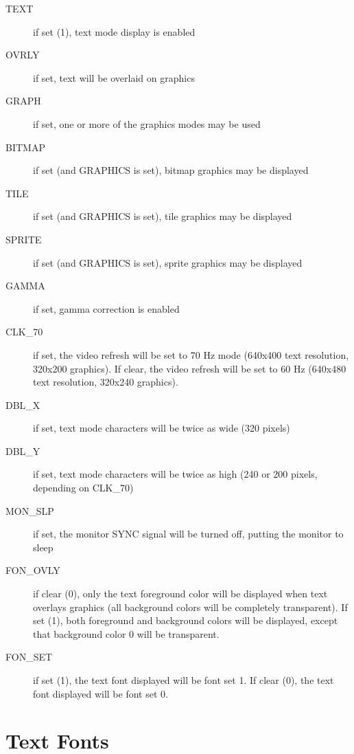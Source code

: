 \begin{description}
    \item[TEXT] if set (1), text mode display is enabled

    \item[OVRLY] if set, text will be overlaid on graphics

    \item[GRAPH] if set, one or more of the graphics modes may be used

    \item[BITMAP] if set (and GRAPHICS is set), bitmap graphics may be displayed

    \item[TILE] if set (and GRAPHICS is set), tile graphics may be displayed

    \item[SPRITE] if set (and GRAPHICS is set), sprite graphics may be displayed

    \item[GAMMA] if set, gamma correction is enabled

    \item[CLK\_70] if set, the video refresh will be set to 70 Hz mode (640x400 text resolution, 320x200 graphics). If clear,
        the video refresh will be set to 60 Hz (640x480 text resolution, 320x240 graphics).

    \item[DBL\_X] if set, text mode characters will be twice as wide (320 pixels)

    \item[DBL\_Y] if set, text mode characters will be twice as high (240 or 200 pixels, depending on CLK\_70)
    
    \item[MON\_SLP] if set, the monitor SYNC signal will be turned off, putting the monitor to sleep
    
    \item[FON\_OVLY] if clear (0), only the text foreground color will be displayed when text overlays graphics (all background colors will be completely transparent). If set (1), both foreground and background colors will be displayed, except that background color 0 will be transparent. 
    
    \item[FON\_SET] if set (1), the text font displayed will be font set 1. If clear (0), the text font displayed will be font set 0.
\end{description}

\section*{Text Fonts}
\label{sec:text_font}

